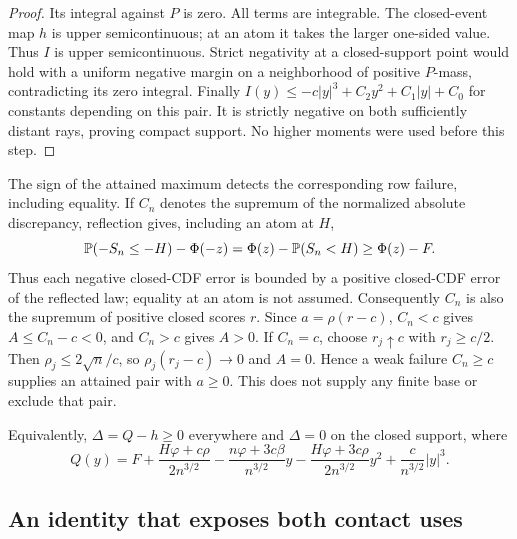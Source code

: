 \begin{proof}
Its integral against $P$ is zero. All terms are integrable.
The closed-event map $h$ is upper semicontinuous; at an atom it takes
the larger one-sided value. Thus $I$ is upper semicontinuous. Strict
negativity at a closed-support point would hold with a uniform negative
margin on a neighborhood of positive $P$-mass, contradicting its zero
integral. Finally $I(y)\le-c|y|^3+C_2y^2+C_1|y|+C_0$ for constants
depending on this pair. It is strictly negative on both sufficiently
distant rays, proving compact support. No higher moments were used
before this step.
\end{proof}

The sign of the attained maximum detects the corresponding row failure,
including equality. If $C_n$ denotes the supremum of the normalized
absolute discrepancy, reflection gives, including an atom at $H$,
\[
 \mathbb P(-S_n\le-H)-\Phi(-z)
 =\Phi(z)-\mathbb P(S_n<H)\ge\Phi(z)-F.
\]
Thus each negative closed-CDF error is bounded by a positive closed-CDF
error of the reflected law; equality at an atom is not assumed.
Consequently $C_n$ is also the supremum of positive
closed scores $r$. Since $a=\rho(r-c)$, $C_n<c$ gives
$A\le C_n-c<0$, and $C_n>c$ gives $A>0$. If $C_n=c$, choose
$r_j\uparrow c$ with $r_j\ge c/2$. Then
$\rho_j\le2\sqrt n/c$, so $\rho_j(r_j-c)\to0$ and $A=0$.
Hence a weak failure $C_n\ge c$ supplies an attained pair with $a\ge0$.
This does not supply any finite base or exclude that pair.

Equivalently, $\Delta=Q-h\ge0$ everywhere and $\Delta=0$ on the closed
support, where
\begin{equation}\label{v8con:Q}
 Q(y)=F+\frac{H\varphi+c\rho}{2n^{3/2}}
 -\frac{n\varphi+3c\beta}{n^{3/2}}y
 -\frac{H\varphi+3c\rho}{2n^{3/2}}y^2
 +\frac c{n^{3/2}}|y|^3.
\end{equation}

\subsection{An identity that exposes both contact uses}

